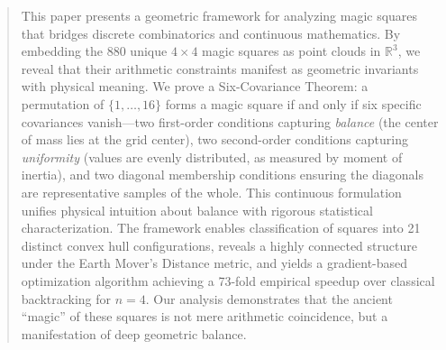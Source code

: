 \begin{abstract}
This paper presents a geometric framework for analyzing magic squares that bridges discrete combinatorics and continuous mathematics. By embedding the 880 unique $4 \times 4$ magic squares as point clouds in $\mathbb{R}^3$, we reveal that their arithmetic constraints manifest as geometric invariants with physical meaning. We prove a Six-Covariance Theorem: a permutation of $\{1,\ldots,16\}$ forms a magic square if and only if six specific covariances vanish---two first-order conditions capturing \textit{balance} (the center of mass lies at the grid center), two second-order conditions capturing \textit{uniformity} (values are evenly distributed, as measured by moment of inertia), and two diagonal membership conditions ensuring the diagonals are representative samples of the whole. This continuous formulation unifies physical intuition about balance with rigorous statistical characterization. The framework enables classification of squares into 21 distinct convex hull configurations, reveals a highly connected structure under the Earth Mover's Distance metric, and yields a gradient-based optimization algorithm achieving a 73-fold empirical speedup over classical backtracking for $n=4$. Our analysis demonstrates that the ancient ``magic'' of these squares is not mere arithmetic coincidence, but a manifestation of deep geometric balance.
\end{abstract}
